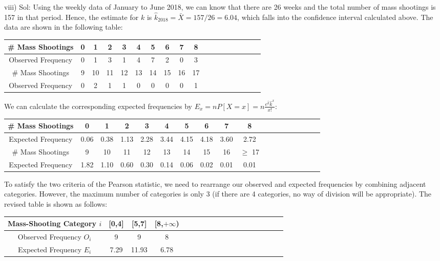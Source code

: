 \documentclass[english]{article}
\begin{document}
\noindent viii) Sol: Using the weekly data of January to June 2018, we can know that there are 26 weeks and the total number of mass shootings is 157 in that period. Hence, the estimate for $k$ is $\hat{k}_{2018}=\bar X=157/26=6.04$, which falls into the confidence interval calculated above. The data are shown in the following table:
\begin{center}
\begin{tabular}{|c|c|c|c|c|c|c|c|c|c|c|c|c|c|c|c|c|c|}
\hline
\# Mass Shootings & 0 & 1 & 2 & 3 & 4 & 5 & 6 & 7 & 8 \\ \hline
Observed Frequency & 0 & 1 & 3 & 1 & 4 & 7 & 2 & 0 & 3 \\ \hline
\# Mass Shootings & 9 & 10 & 11 & 12 & 13 & 14 & 15 & 16 & 17 \\ \hline
Observed Frequency & 0 & 2  & 1  & 1  & 0  & 0  & 0  & 0  & 1 \\ \hline
\end{tabular}
\end{center}
\par We can calculate the corresponding expected frequencies by $E_{x}=nP[X=x]=n\frac{e^{\hat k}\hat k^x}{x!}$:
\begin{center}
\begin{tabular}{|c|c|c|c|c|c|c|c|c|c|c|c|c|c|c|c|c|c|}
\hline
\# Mass Shootings &0 & 1 & 2 & 3 & 4 & 5 & 6 & 7 & 8 \\ \hline
Expected Frequency & 0.06 & 0.38 & 1.13 & 2.28 & 3.44 & 4.15 & 4.18 & 3.60 & 2.72\\ \hline
\# Mass Shootings & 9 & 10 & 11 & 12 & 13 & 14 & 15 & 16 & $\geq$ 17 \\ \hline
Expected Frequency  & 1.82 & 1.10  & 0.60  & 0.30  & 0.14  & 0.06  & 0.02  & 0.01  & 0.01\\ \hline
\end{tabular}
\end{center}
\par To satisfy the two criteria of the Pearson statistic, we need to rearrange our observed and expected frequencies by combining adjacent categories. However, the maximum number of categories is only 3 (if there are 4 categories, no way of division will be appropriate). The revised table is shown as follows:
\begin{center}
\begin{tabular}{|c|c|c|c|c|c|c|c|c|c|c|c|c|c|c|c|c|c|}
\hline
Mass-Shooting Category $i$ & [0,4] & [5,7] & [8,$+\infty$) \\ \hline
Observed Frequency $O_i$ & 9 & 9 & 8 \\ \hline
Expected Frequency $E_i$ & 7.29 & 11.93 & 6.78 \\ \hline
\end{tabular}
\end{center}
\end{document}
